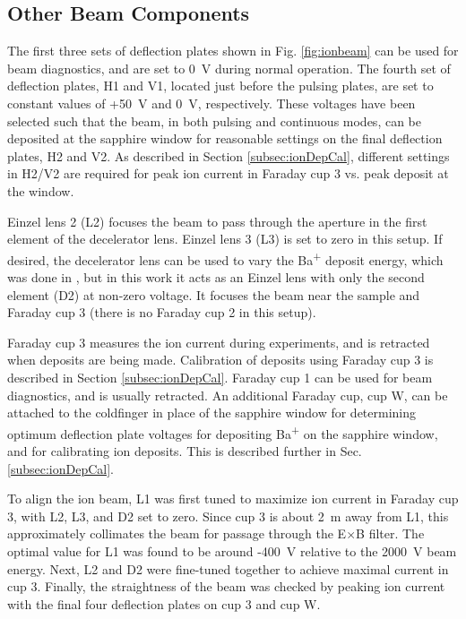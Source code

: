 \subsection{Other Beam Components}

The first three sets of deflection plates shown in Fig. \ref{fig:ionbeam} can be used for beam diagnostics, and are set to 0~V during normal operation.  The fourth set of deflection plates, H1 and V1, located just before the pulsing plates, are set to constant values of +50~V and 0~V, respectively.  These voltages have been selected such that the beam, in both pulsing and continuous modes, can be deposited at the sapphire window for reasonable settings on the final deflection plates, H2 and V2.  As described in Section \ref{subsec:ionDepCal}, different settings in H2/V2 are required for peak ion current in Faraday cup 3 vs. peak deposit at the window.

Einzel lens 2 (L2) focuses the beam to pass through the aperture in the first element of the decelerator lens.  Einzel lens 3 (L3) is set to zero in this setup.  If desired, the decelerator lens can be used to vary the Ba\textsuperscript{+} deposit energy, which was done in \cite{Shon}, but in this work it acts as an Einzel lens with only the second element (D2) at non-zero voltage.  It focuses the beam near the sample and Faraday cup 3 (there is no Faraday cup 2 in this setup).

Faraday cup 3 measures the ion current during experiments, and is retracted when deposits are being made.  Calibration of deposits using Faraday cup 3 is described in Section \ref{subsec:ionDepCal}.  Faraday cup 1 can be used for beam diagnostics, and is usually retracted.  An additional Faraday cup, cup W, can be attached to the coldfinger in place of the sapphire window for determining optimum deflection plate voltages for depositing Ba\textsuperscript{+} on the sapphire window, and for calibrating ion deposits.  This is described further in Sec. \ref{subsec:ionDepCal}.

To align the ion beam, L1 was first tuned to maximize ion current in Faraday cup 3, with L2, L3, and D2 set to zero.  Since cup 3 is about 2~m away from L1, this approximately collimates the beam for passage through the E$\times$B filter.  The optimal value for L1 was found to be around -400~V relative to the 2000~V beam energy.  Next, L2 and D2 were fine-tuned together to achieve maximal current in cup 3.  Finally, the straightness of the beam was checked by peaking ion current with the final four deflection plates on cup 3 and cup W.

